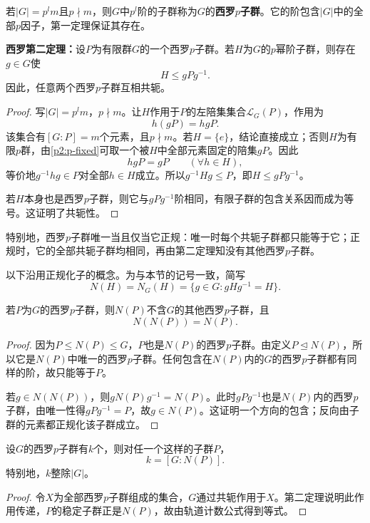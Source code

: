 \begin{definition}
\label{p2:concept:c2-l1287}若$|G|=p^lm$且$p\nmid m$，则$G$中$p^l$阶的子群称为$G$的\textbf{西罗$p$子群}。它的阶包含$|G|$中的全部$p$因子，第一定理保证其存在。
\end{definition}

\begin{theorem}\label{p2:sylow-two}
\textbf{西罗第二定理：}设$P$为有限群$G$的一个西罗$p$子群。若$H$为$G$的$p$幂阶子群，则存在$g\in G$使
\[
H\leq gPg^{-1}.
\]
因此，任意两个西罗$p$子群互相共轭。
\end{theorem}
\begin{proof}
写$|G|=p^lm$，$p\nmid m$。让$H$作用于$P$的左陪集集合$\mathcal L_G(P)$，作用为
\[
h(gP)=hgP.
\]
该集合有$[G:P]=m$个元素，且$p\nmid m$。若$H=\{e\}$，结论直接成立；否则$H$为有限$p$群，由\ref{p2:p-fixed}可取一个被$H$中全部元素固定的陪集$gP$。因此
\[
hgP=gP\qquad(\forall h\in H),
\]
等价地$g^{-1}hg\in P$对全部$h\in H$成立。所以$g^{-1}Hg\leq P$，即$H\leq gPg^{-1}$。

若$H$本身也是西罗$p$子群，则它与$gPg^{-1}$阶相同，有限子群的包含关系因而成为等号。这证明了共轭性。
\end{proof}

特别地，西罗$p$子群唯一当且仅当它正规：唯一时每个共轭子群都只能等于它；正规时，它的全部共轭子群均相同，再由第二定理知没有其他西罗$p$子群。

以下沿用正规化子的概念。为与本节的记号一致，简写
\[
N(H)=N_G(H)=\{g\in G:gHg^{-1}=H\}.
\]

\begin{corollary}\label{p2:sylow-normalizer}
若$P$为$G$的西罗$p$子群，则$N(P)$不含$G$的其他西罗$p$子群，且
\[
N(N(P))=N(P).
\]
\end{corollary}
\begin{proof}
因为$P\leq N(P)\leq G$，$P$也是$N(P)$的西罗$p$子群。由定义$P\trianglelefteq N(P)$，所以它是$N(P)$中唯一的西罗$p$子群。任何包含在$N(P)$内的$G$的西罗$p$子群都有同样的阶，故只能等于$P$。

若$g\in N(N(P))$，则$gN(P)g^{-1}=N(P)$。此时$gPg^{-1}$也是$N(P)$内的西罗$p$子群，由唯一性得$gPg^{-1}=P$，故$g\in N(P)$。这证明一个方向的包含；反向由子群的元素都正规化该子群成立。
\end{proof}

\begin{proposition}
设$G$的西罗$p$子群有$k$个，则对任一个这样的子群$P$，
\[
k=[G:N(P)].
\]
特别地，$k$整除$|G|$。
\end{proposition}
\begin{proof}
令$X$为全部西罗$p$子群组成的集合，$G$通过共轭作用于$X$。第二定理说明此作用传递，$P$的稳定子群正是$N(P)$，故由轨道计数公式得到等式。
\end{proof}

